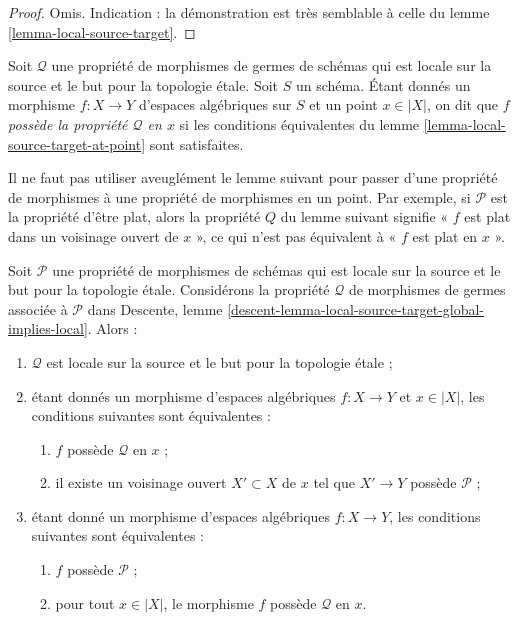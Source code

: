 \begin{proof}
Omis. Indication : la démonstration est très semblable à celle du
lemme \ref{lemma-local-source-target}.
\end{proof}

\begin{definition}
\label{definition-P-at-point}
Soit $\mathcal{Q}$ une propriété de morphismes de germes
de schémas qui est locale sur la source et le but pour la topologie étale.
Soit $S$ un schéma.
Étant donnés un morphisme $f : X \to Y$ d'espaces algébriques sur $S$ et
un point $x \in |X|$, on dit que $f$
{\it possède la propriété $\mathcal{Q}$ en $x$} si les conditions équivalentes du
lemme \ref{lemma-local-source-target-at-point}
sont satisfaites.
\end{definition}

\noindent
Il ne faut pas utiliser aveuglément le lemme suivant pour passer d'une propriété
de morphismes à une propriété de morphismes en un point. Par exemple, si
$\mathcal{P}$ est la propriété d'être plat, alors la propriété
$Q$ du lemme suivant signifie « $f$ est plat dans un voisinage ouvert
de $x$ », ce qui n'est pas équivalent à « $f$ est plat en $x$ ».

\begin{lemma}
\label{lemma-local-source-target-global-implies-local}
Soit $\mathcal{P}$ une propriété de morphismes de schémas
qui est locale sur la source et le but pour la topologie étale.
Considérons la propriété $\mathcal{Q}$ de morphismes
de germes associée à $\mathcal{P}$ dans
Descente, lemme \ref{descent-lemma-local-source-target-global-implies-local}.
Alors :
\begin{enumerate}
\item $\mathcal{Q}$ est locale sur la source et le but pour la topologie étale ;
\item étant donnés un morphisme d'espaces algébriques $f : X \to Y$ et $x \in |X|$,
les conditions suivantes sont équivalentes :
\begin{enumerate}
\item $f$ possède $\mathcal{Q}$ en $x$ ;
\item il existe un voisinage ouvert $X' \subset X$ de $x$
tel que $X' \to Y$ possède $\mathcal{P}$ ;
\end{enumerate}
\item étant donné un morphisme d'espaces algébriques $f : X \to Y$,
les conditions suivantes sont équivalentes :
\begin{enumerate}
\item $f$ possède $\mathcal{P}$ ;
\item pour tout $x \in |X|$, le morphisme $f$ possède $\mathcal{Q}$ en $x$.
\end{enumerate}
\end{enumerate}
\end{lemma}

